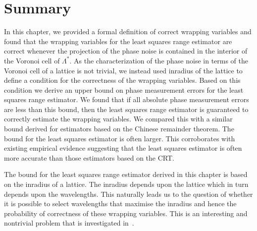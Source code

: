 
\section{Summary}\label{ch4:sec:summary}
In this chapter, we provided a formal definition of correct wrapping variables and found that the wrapping variables for the least squares range estimator are correct whenever the projection of the phase noise is contained in the interior of the Voronoi cell of $\Lambda^*$. As the characterization of the phase noise in terms of the Voronoi cell of a lattice is not trivial, we instead used inradius of the lattice to define a condition for the correctness of the wrapping variables. Based on this condition we derive an upper bound on phase measurement errors for the least squares range estimator. We found that if all absolute phase measurement errors are less than this bound, then the least squares range estimator is guaranteed to correctly estimate the wrapping variables. We compared this with a similar bound derived for estimators based on the Chinese remainder theorem. The bound for the least squares estimator is often larger. This corroborates with existing empirical evidence suggesting that the least squares estimator is often more accurate than those estimators based on the CRT.


The bound for the least squares range estimator derived in this chapter is based on the inradius of a lattice. The inradius depends upon the lattice which in turn depends upon the wavelengths. This naturally leads us to the question of whether it is possible to select wavelengths that maximise the inradius and hence the probability of correctness of these wrapping variables. This is an interesting and nontrivial problem that is investigated in~.

